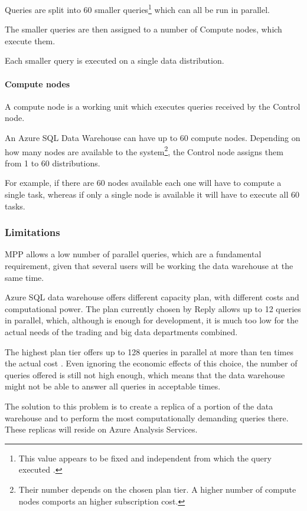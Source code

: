         Queries are split into 60 smaller queries\footnote{
            This value appears to be fixed and independent from which the query executed \cite{bib:azure:dwh:mpp}.
        } which can all be run in parallel.
        
        The smaller queries are then assigned to a number of Compute nodes, which execute them.
        
        Each smaller query is executed on a single data distribution.
        
    \paragraph{Compute nodes}
        A compute node is a working unit which executes queries received by the Control node.
        
        An Azure SQL Data Warehouse can have up to 60 compute nodes.
        Depending on how many nodes are available to the system\footnote{
            Their number depends on the chosen plan tier. A higher number of compute nodes comports an higher subscription cost.
        }, the Control node assigns them from 1 to 60 distributions.
        
        For example, if there are 60 nodes available each one will have to compute a single task, whereas if only a single node is available it will have to execute all 60 tasks.

\subsubsection{Limitations}
    MPP allows a low number of parallel queries, which are a fundamental requirement, given that several users will be working the data warehouse at the same time.
    
    Azure SQL data warehouse offers different capacity plan, with different costs and computational power.
    The plan currently chosen by Reply allows up to 12 queries in parallel, which, although is enough for development, it is much too low for the actual needs of the trading and big data departments combined.
    
    The highest plan tier offers up to 128 queries in parallel at more than ten times the actual cost \cite{bib:azure:databricks:concurrency_limits}.
    Even ignoring the economic effects of this choice, the number of queries offered is still not high enough, which means that the data warehouse might not be able to answer all queries in acceptable times.
    
    The solution to this problem is to create a replica of a portion of the data warehouse and to perform the most computationally demanding queries there.
    These replicas will reside on Azure Analysis Services.
    